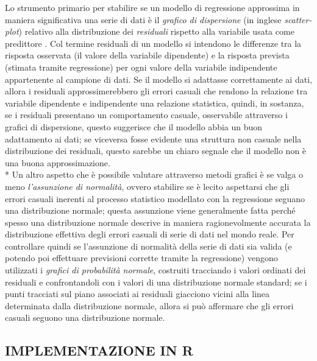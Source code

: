 \documentclass[12pt,a4paper,openright,twoside]{report}
\begin{document}
Lo strumento primario per stabilire se un modello di regressione approssima in maniera significativa una serie di dati è il \emph{grafico di dispersione} (in inglese \emph{scatter-plot}) relativo alla distribuzione dei \emph{residuali} rispetto alla variabile usata come predittore \cite{nistSemantech}. Col termine residuali di un modello si intendono le differenze
tra la risposta osservata (il valore della variabile dipendente) e la risposta prevista (stimata tramite regressione) per ogni valore della variabile indipendente appartenente al campione di dati. Se il modello si adattasse correttamente ai dati, allora i residuali approssimerebbero gli errori casuali che rendono la relazione tra variabile dipendente e indipendente una relazione statistica, quindi, in sostanza, se i residuali presentano un comportamento casuale, osservabile attraverso i grafici di dispersione, questo suggerisce che il modello abbia un buon adattamento ai dati; se viceversa fosse evidente una struttura non casuale nella distribuzione dei residuali, questo sarebbe un chiaro segnale che il modello non è una buona approssimazione.\\*
Un altro aspetto che è possibile valutare attraverso metodi grafici è se valga o meno \emph{l'assunzione di normalità}, ovvero stabilire se è lecito aspettarsi che gli errori casuali inerenti al processo statistico modellato con la regressione seguano una distribuzione normale; questa assunzione viene generalmente fatta perché spesso una distribuzione normale descrive in maniera ragionevolmente accurata la distribuzione effettiva degli errori casuali di serie di dati nel mondo reale. Per controllare quindi se l'assunzione di normalità della serie di dati sia valida (e potendo poi effettuare previsioni corrette tramite la regressione) vengono utilizzati i \emph{grafici di probabilità normale}, costruiti tracciando i valori ordinati dei residuali e confrontandoli con i valori di una distribuzione  normale standard; se i punti tracciati sul piano associati ai residuali giacciono vicini alla linea determinata dalla distribuzione normale, allora si può affermare che gli errori casuali seguono una distribuzione normale.


\subsection{IMPLEMENTAZIONE IN R}
\end{document}

